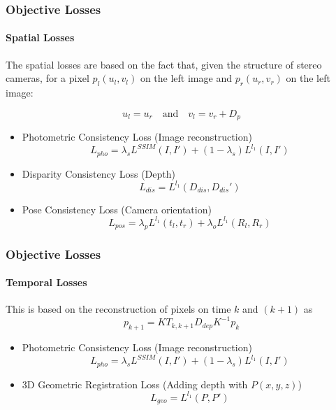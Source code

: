\begin{frame}
    \frametitle{Objective Losses}
    \framesubtitle{Spatial Losses}
    The spatial losses are based on the fact that, given the structure of stereo cameras, for a pixel $p_l(u_l, v_l)$ on the left image and $p_r(u_r, v_r)$ on the left image:

    \[ u_l = u_r \hspace{1em} \text{and} \hspace{1em} v_l = v_r + D_p \] 
    \begin{itemize}
        \item Photometric Consistency Loss (Image reconstruction)
        \[ L_{pho} = \lambda_s L^{SSIM} (I, I') + (1 - \lambda_s)L^{l_1}(I, I') \]

        \item Disparity Consistency Loss (Depth)
        \[ L_{dis} = L^{l_1}(D_{dis}, D_{dis}') \]

        \item Pose Consistency Loss (Camera orientation)
        \[ L_{pos} = \lambda_pL^{l_1}(t_l, t_r) + \lambda_oL^{l_1}(R_l, R_r) \]
    \end{itemize}
\end{frame}

\begin{frame}
    \frametitle{Objective Losses}
    \framesubtitle{Temporal Losses}
    This is based on the reconstruction of pixels on time $k$ and $(k + 1)$ as
    \[p_{k + 1} = K T_{k, k+1} D_{dep} K^{-1} p_k \]
    \begin{itemize}
        \item Photometric Consistency Loss (Image reconstruction)
        \[ L_{pho} = \lambda_s L^{SSIM} (I, I') + (1 - \lambda_s)L^{l_1}(I, I') \]

        \item 3D Geometric Registration Loss (Adding depth with $P(x, y, z)$)
        \[ L_{geo} = L^{l_1} (P, P') \]

    \end{itemize}
\end{frame}
